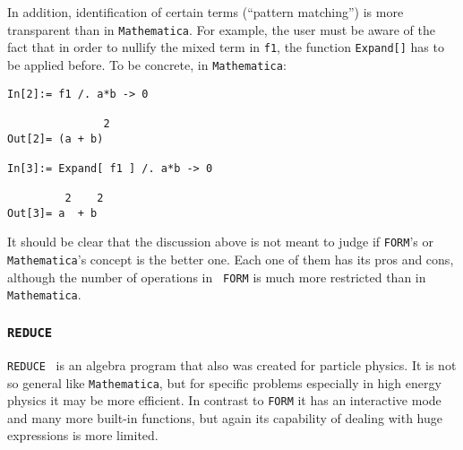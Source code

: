 In addition, identification of certain terms (``pattern matching'') is
more transparent
than in {\tt Mathematica}. For example, the user must be aware
of the fact that in order to nullify the mixed term in {\tt f1},
the function {\tt Expand[]} has to be applied before. 
To be concrete, in {\tt Mathematica}:
\begin{verbatim}
In[2]:= f1 /. a*b -> 0

               2
Out[2]= (a + b)

In[3]:= Expand[ f1 ] /. a*b -> 0

         2    2
Out[3]= a  + b
\end{verbatim}


It should be clear that the discussion above is not meant to judge if
{\tt FORM}'s or {\tt Mathematica}'s concept is the better one.  Each one
of them has its pros and cons, although the number of operations in {\tt
  FORM} is much more restricted than in {\tt Mathematica}.

\subsubsection{{\tt REDUCE}}
%
{\tt REDUCE}~\cite{reduce} is an algebra program that also was created
for particle physics. It is not so general like {\tt Mathematica}, but
for specific problems especially in high energy physics it may be more
efficient. In contrast to {\tt FORM} it has an interactive mode and many
more built-in functions, but again its capability of dealing with huge
expressions is more limited.

%
%

